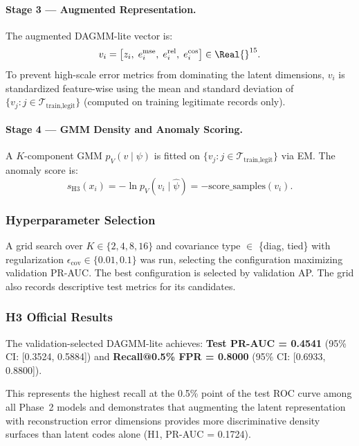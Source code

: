 \paragraph{Stage 3 --- Augmented Representation.}
The augmented DAGMM-lite vector is:
\begin{equation}
    v_i = \left[z_i,\; e^{\text{mse}}_i,\; e^{\text{rel}}_i,\; e^{\text{cos}}_i\right] \in \Real{}^{15}.
    \label{eq:dagmm_aug}
\end{equation}
To prevent high-scale error metrics from dominating the latent dimensions, $v_i$ is standardized feature-wise using the mean and standard deviation of $\{v_j : j \in \mathcal{T}_{\text{train,legit}}\}$ (computed on training legitimate records only).

\paragraph{Stage 4 --- GMM Density and Anomaly Scoring.}
A $K$-component GMM $p_V(v \mid \psi)$ is fitted on $\{v_j : j \in \mathcal{T}_{\text{train,legit}}\}$ via EM. The anomaly score is:
\begin{equation}
    s_{\text{H3}}(x_i) = -\ln p_V(v_i \mid \hat{\psi}) = -\text{score\_samples}(v_i).
    \label{eq:dagmm_score}
\end{equation}

\subsubsection{Hyperparameter Selection}
A grid search over $K \in \{2, 4, 8, 16\}$ and covariance type $\in$ \{diag, tied\} with regularization $\epsilon_{\text{cov}} \in \{0.01, 0.1\}$ was run, selecting the configuration maximizing validation PR-AUC. The best configuration is selected by validation AP. The grid also records descriptive test metrics for its candidates.

\subsubsection{H3 Official Results}
The validation-selected DAGMM-lite achieves:
\textbf{Test PR-AUC = 0.4541} (95\% CI: [0.3524, 0.5884]) and \textbf{Recall@0.5\% FPR = 0.8000} (95\% CI: [0.6933, 0.8800]).

This represents the highest recall at the 0.5\% point of the test ROC curve among all Phase~2 models and demonstrates that augmenting the latent representation with reconstruction error dimensions provides more discriminative density surfaces than latent codes alone (H1, PR-AUC = 0.1724).

